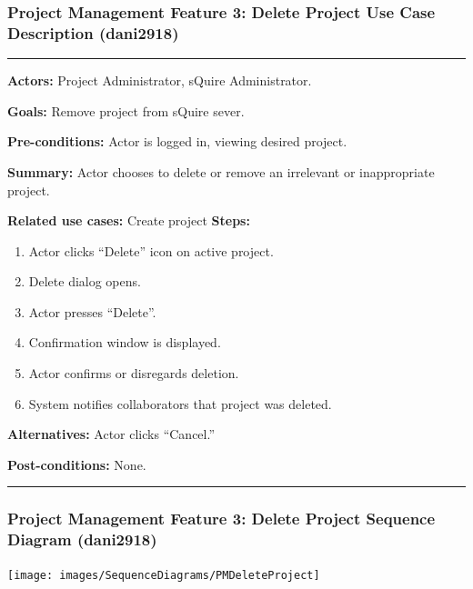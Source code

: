 \documentclass[twoside,letterpaper]{article}
\begin{document}
\newpage


\subsubsection[Project Management Feature 3: Delete Project Use Case Description (dani2918)]{\rmfamily\bfseries\color{black}
	Project Management Feature 3: Delete Project Use Case Description (dani2918)}
\hypertarget{RefHeading22059017292}{}
\bigskip

\vspace{2pt}
\hrule
\vspace{8pt}
 \noindent \textbf{Actors:} Project Administrator, sQuire Administrator. \newline
 
 \noindent \textbf{Goals:} Remove project from sQuire sever. \newline

 \noindent  \textbf{Pre-conditions:} Actor is logged in, viewing desired project.  \newline
 
 \noindent \textbf{Summary:} Actor chooses to delete or remove an irrelevant or inappropriate project.  \newline
 
 \noindent \textbf{Related use cases:} Create project\newline
\textbf{Steps:} \begin{enumerate}
  \item Actor clicks ``Delete'' icon on active project.
  \item Delete dialog opens.
  \item Actor presses ``Delete''.
  \item Confirmation window is displayed.
  \item Actor confirms or disregards deletion.
  \item System notifies collaborators that project was deleted.
 \end{enumerate}
 \textbf{Alternatives:} Actor clicks ``Cancel.'' \newline
 
 \noindent  \textbf{Post-conditions:} None. \newline
\vspace{8pt}
\hrule


\vspace{20pt}
\subsubsection[Project Management Feature 3: Delete Project Sequence Diagram (dani2918)]{\rmfamily\bfseries\color{black}
	Project Management Feature 3: Delete Project Sequence Diagram  (dani2918)}
\texttt{[image: images/SequenceDiagrams/PMDeleteProject]}
\end{document}
